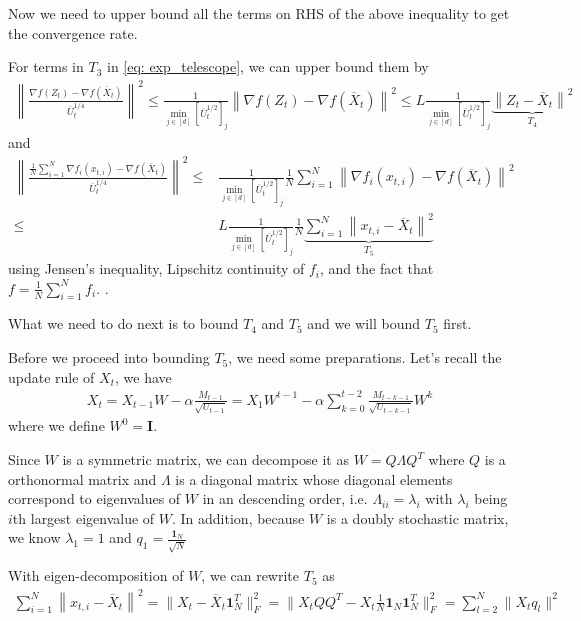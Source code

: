 \documentclass{article} %
\begin{document}
Now we need to upper bound all the terms on RHS of the above inequality to get the convergence rate.

For terms in $T_3$ in \eqref{eq: exp_telescope}, we can upper bound them by
\begin{align}
\left\| \frac{\nabla f( Z_{t}) -  \nabla f( \overline X_{t})}{\overline U_{t}^{1/4}}\right\|^2 \leq \frac{1}{\min_{j \in [d]}[\overline U_{t}^{1/2}]_j}\left\| \nabla f( Z_{t}) -  \nabla f( \overline X_{t})\right\|^2  \leq   L \frac{1}{\min_{j \in [d]}[\overline U_{t}^{1/2}]_j} \underbrace{\left\|  Z_{t} -  \overline X_{t}\right\|^2}_{T_4} 
\end{align}
and 
\begin{align}\label{eq: T_3_bound_first}
\left\| \frac{\frac{1}{N}\sum_{i=1}^N \nabla f_i( x_{t,i}) -  \nabla f( \overline X_{t})}{\overline U_{t}^{1/4}}  \right\|^2 
\leq & \frac{1}{\min_{j \in [d]}[\overline U_{t}^{1/2}]_j}  \frac{1}{N} \sum_{i=1}^N\left\| { \nabla f_i( x_{t,i}) -  \nabla f( \overline X_{t})}  \right\|^2 \nonumber \\
\leq & L  \frac{1}{\min_{j \in [d]}[\overline U_{t}^{1/2}]_j}  \frac{1}{N} \underbrace{\sum_{i=1}^N\left\| {  x_{t,i} -   \overline X_{t}}  \right\|^2}_{T_5} 
\end{align}
using Jensen's inequality, Lipschitz continuity of $f_i$, and the fact that $f = \frac{1}{N}\sum_{i=1}^N {f_i}$. .

What we need to do next is to bound  $T_4$ and $T_5$ and we will bound $T_5$ first.


Before we proceed into bounding $T_5$, we need some preparations. Let's recall the update rule of $X_t$, we have
\begin{align} \label{eq: update_X}
X_t = X_{t-1} W - \alpha  \frac{M_{t-1}}{\sqrt{U_{t-1}}} = X_{1} W^{t-1} -\alpha \sum_{k=0}^{t-2} \frac{M_{t-k-1}}{\sqrt{U_{t-k-1}}}  W^{k}  
\end{align}
where we define $W^0 = \mathbf I$.

Since $W$ is a symmetric matrix, we can decompose it as $W = Q \Lambda Q^T$ where $Q$ is a orthonormal matrix and $\Lambda$ is a diagonal matrix whose diagonal elements correspond to eigenvalues of $W$ in an descending order, i.e. $\Lambda_{ii} = \lambda_i$ with $\lambda_i$ being $i$th largest eigenvalue of $W$. In addition, because $W$ is a doubly stochastic matrix, we know $\lambda_{1} = 1$ and $q_1 = \frac{\mathbf 1_N}{\sqrt{N}}$ 

With eigen-decomposition of $W$, we can rewrite $T_5$ as 
\begin{align}\label{eq: t2_matrix}
\sum_{i=1}^N\left\| {  x_{t,i} -   \overline X_{t}}  \right\|^2 =  \|X_t - \overline X_t \mathbf 1^T_N\|_F^2 =  \|X_tQ Q^T -  X_t \frac{1}{N} \mathbf 1_N \mathbf 1^T_N\|_F^2  = \sum_{l=2}^N \|X_t q_l\|^2 
\end{align}
\end{document}
